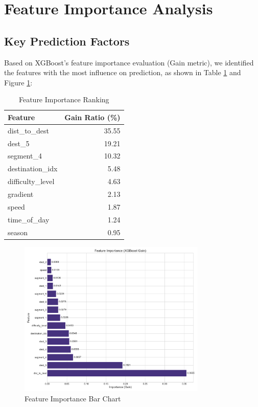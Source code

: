 \documentclass[12pt]{article}
\begin{document}
\section{Feature Importance Analysis}

\subsection{Key Prediction Factors}

Based on XGBoost's feature importance evaluation (Gain metric), we identified the features with the most influence on prediction, as shown in Table \ref{tab:feature_importance} and Figure \ref{fig:feature_importance}:

\begin{table}[H]
\centering
\caption{Feature Importance Ranking}
\label{tab:feature_importance}
\begin{tabular}{lr}
\toprule
Feature & Gain Ratio (\%) \\
\midrule
dist\_to\_dest & 35.55 \\
dest\_5 & 19.21 \\
segment\_4 & 10.32 \\
destination\_idx & 5.48 \\
difficulty\_level & 4.63 \\
gradient & 2.13 \\
speed & 1.87 \\
time\_of\_day & 1.24 \\
season & 0.95 \\
\bottomrule
\end{tabular}
\end{table}

\begin{figure}[H]
\centering
\includegraphics[width=0.8\textwidth]{visualization_results/feature_importance.png}
\caption{Feature Importance Bar Chart}
\label{fig:feature_importance}
\end{figure}
\end{document}
